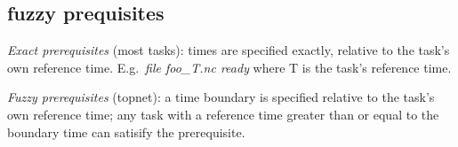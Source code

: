 \documentclass[11pt,a4paper]{article}
\begin{document}
\subsection{fuzzy prequisites}

{\em Exact prerequisites} (most tasks): times are specified exactly,
relative to the task's own reference time.  E.g.\ {\em file foo\_{T}.nc
ready} where T is the task's reference time.

{\em Fuzzy prerequisites} (topnet): a time boundary is specified
relative to the task's own reference time; any task with a reference
time greater than or equal to the boundary time can satisify the
prerequisite.
\end{document}
